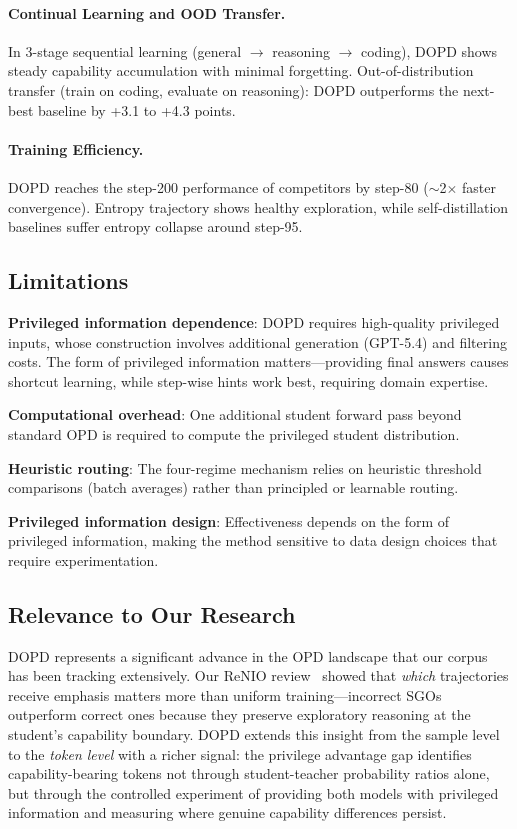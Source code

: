 \documentclass[11pt,a4paper]{article}
\begin{document}
\paragraph{Continual Learning and OOD Transfer.} In 3-stage sequential learning (general $\to$ reasoning $\to$ coding), DOPD shows steady capability accumulation with minimal forgetting. Out-of-distribution transfer (train on coding, evaluate on reasoning): DOPD outperforms the next-best baseline by +3.1 to +4.3 points.

\paragraph{Training Efficiency.} DOPD reaches the step-200 performance of competitors by step-80 ($\sim$2$\times$ faster convergence). Entropy trajectory shows healthy exploration, while self-distillation baselines suffer entropy collapse around step-95.

\subsection{Limitations}

\textbf{Privileged information dependence}: DOPD requires high-quality privileged inputs, whose construction involves additional generation (GPT-5.4) and filtering costs. The form of privileged information matters---providing final answers causes shortcut learning, while step-wise hints work best, requiring domain expertise.

\textbf{Computational overhead}: One additional student forward pass beyond standard OPD is required to compute the privileged student distribution.

\textbf{Heuristic routing}: The four-regime mechanism relies on heuristic threshold comparisons (batch averages) rather than principled or learnable routing.

\textbf{Privileged information design}: Effectiveness depends on the form of privileged information, making the method sensitive to data design choices that require experimentation.

\subsection{Relevance to Our Research}

DOPD represents a significant advance in the OPD landscape that our corpus has been tracking extensively. Our ReNIO review~\cite{lin2026renio} showed that \emph{which} trajectories receive emphasis matters more than uniform training---incorrect SGOs outperform correct ones because they preserve exploratory reasoning at the student's capability boundary. DOPD extends this insight from the sample level to the \emph{token level} with a richer signal: the privilege advantage gap identifies capability-bearing tokens not through student-teacher probability ratios alone, but through the controlled experiment of providing both models with privileged information and measuring where genuine capability differences persist.
\end{document}
